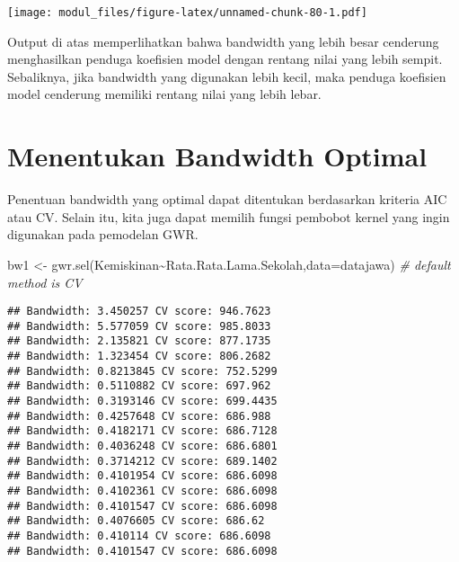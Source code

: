 \documentclass[
]{book}
\newenvironment{Shaded}{\begin{snugshade}}{\end{snugshade}}
\newcommand{\AttributeTok}[1]{\textcolor[rgb]{0.77,0.63,0.00}{#1}}
\newcommand{\CommentTok}[1]{\textcolor[rgb]{0.56,0.35,0.01}{\textit{#1}}}
\newcommand{\FunctionTok}[1]{\textcolor[rgb]{0.00,0.00,0.00}{#1}}
\newcommand{\NormalTok}[1]{#1}
\newcommand{\OtherTok}[1]{\textcolor[rgb]{0.56,0.35,0.01}{#1}}
\newcommand{\SpecialCharTok}[1]{\textcolor[rgb]{0.00,0.00,0.00}{#1}}
\newcommand{\StringTok}[1]{\textcolor[rgb]{0.31,0.60,0.02}{#1}}
\begin{document}
\begin{Shaded}
\end{Shaded}

\texttt{[image: modul\_files/figure-latex/unnamed-chunk-80-1.pdf]}

Output di atas memperlihatkan bahwa bandwidth yang lebih besar cenderung menghasilkan penduga koefisien model dengan rentang nilai yang lebih sempit. Sebaliknya, jika bandwidth yang digunakan lebih kecil, maka penduga koefisien model cenderung memiliki rentang nilai yang lebih lebar.

\hypertarget{menentukan-bandwidth-optimal}{%
\section{Menentukan Bandwidth Optimal}\label{menentukan-bandwidth-optimal}}

Penentuan bandwidth yang optimal dapat ditentukan berdasarkan kriteria AIC atau CV. Selain itu, kita juga dapat memilih fungsi pembobot kernel yang ingin digunakan pada pemodelan GWR.

\begin{Shaded}
\begin{Highlighting}[]
\NormalTok{bw1 }\OtherTok{\textless{}{-}} \FunctionTok{gwr.sel}\NormalTok{(Kemiskinan}\SpecialCharTok{\textasciitilde{}}\NormalTok{Rata.Rata.Lama.Sekolah,}\AttributeTok{data=}\NormalTok{datajawa) }\CommentTok{\# default method is CV}
\end{Highlighting}
\end{Shaded}

\begin{verbatim}
## Bandwidth: 3.450257 CV score: 946.7623 
## Bandwidth: 5.577059 CV score: 985.8033 
## Bandwidth: 2.135821 CV score: 877.1735 
## Bandwidth: 1.323454 CV score: 806.2682 
## Bandwidth: 0.8213845 CV score: 752.5299 
## Bandwidth: 0.5110882 CV score: 697.962 
## Bandwidth: 0.3193146 CV score: 699.4435 
## Bandwidth: 0.4257648 CV score: 686.988 
## Bandwidth: 0.4182171 CV score: 686.7128 
## Bandwidth: 0.4036248 CV score: 686.6801 
## Bandwidth: 0.3714212 CV score: 689.1402 
## Bandwidth: 0.4101954 CV score: 686.6098 
## Bandwidth: 0.4102361 CV score: 686.6098 
## Bandwidth: 0.4101547 CV score: 686.6098 
## Bandwidth: 0.4076605 CV score: 686.62 
## Bandwidth: 0.410114 CV score: 686.6098 
## Bandwidth: 0.4101547 CV score: 686.6098
\end{verbatim}
\end{document}
